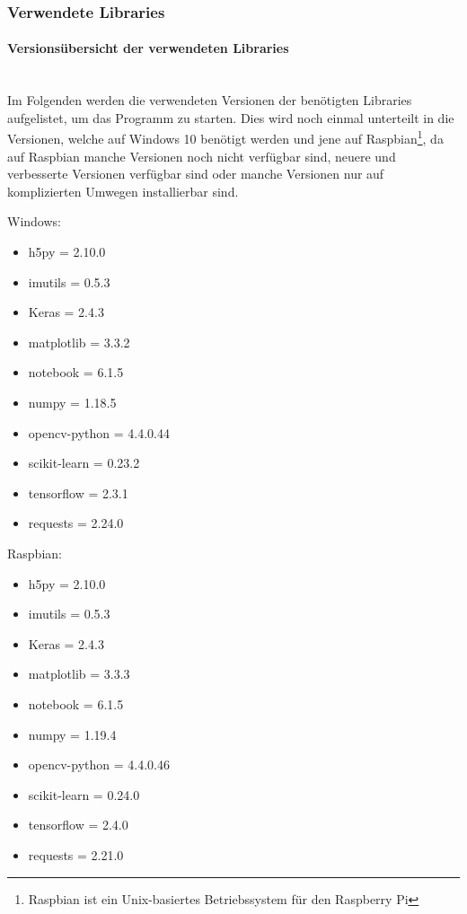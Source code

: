 \subsubsection{Verwendete Libraries}

\paragraph{Versionsübersicht der verwendeten Libraries}\mbox{}\\
Im Folgenden werden die verwendeten Versionen der benötigten Libraries aufgelistet, um das Programm zu starten. Dies wird noch einmal 
unterteilt in die Versionen, welche auf Windows 10 benötigt werden und jene auf Raspbian\footnote{Raspbian ist ein Unix-basiertes Betriebssystem für den Raspberry Pi}, da auf Raspbian manche Versionen noch 
nicht verfügbar sind, neuere und verbesserte Versionen verfügbar sind oder manche Versionen nur auf komplizierten Umwegen installierbar sind.

Windows:

\begin{itemize}
    \item h5py = 2.10.0
    \item imutils = 0.5.3
    \item Keras = 2.4.3
    \item matplotlib = 3.3.2
    \item notebook = 6.1.5
    \item numpy = 1.18.5
    \item opencv-python = 4.4.0.44
    \item scikit-learn = 0.23.2
    \item tensorflow = 2.3.1
    \item requests = 2.24.0
\end{itemize}

Raspbian:

\begin{itemize}
    \item h5py = 2.10.0
    \item imutils = 0.5.3
    \item Keras = 2.4.3
    \item matplotlib = 3.3.3
    \item notebook = 6.1.5
    \item numpy = 1.19.4
    \item opencv-python = 4.4.0.46
    \item scikit-learn = 0.24.0
    \item tensorflow = 2.4.0
    \item requests = 2.21.0
\end{itemize}

